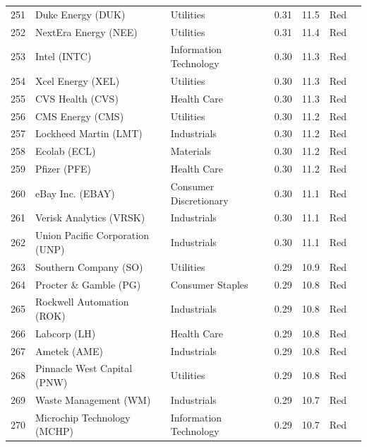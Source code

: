 \documentclass[11pt,a4paper]{article}
\begin{document}
{\begin{longtable}{r p{4.4cm} p{2.8cm} r r l l}
251 & Duke Energy (DUK) & Utilities & 0.31 & 11.5 & \cellcolor[HTML]{F4B6B6}Red &  \\
252 & NextEra Energy (NEE) & Utilities & 0.31 & 11.4 & \cellcolor[HTML]{F4B6B6}Red &  \\
253 & Intel (INTC) & Information Technology & 0.30 & 11.3 & \cellcolor[HTML]{F4B6B6}Red &  \\
254 & Xcel Energy (XEL) & Utilities & 0.30 & 11.3 & \cellcolor[HTML]{F4B6B6}Red &  \\
255 & CVS Health (CVS) & Health Care & 0.30 & 11.3 & \cellcolor[HTML]{F4B6B6}Red &  \\
256 & CMS Energy (CMS) & Utilities & 0.30 & 11.2 & \cellcolor[HTML]{F4B6B6}Red &  \\
257 & Lockheed Martin (LMT) & Industrials & 0.30 & 11.2 & \cellcolor[HTML]{F4B6B6}Red &  \\
258 & Ecolab (ECL) & Materials & 0.30 & 11.2 & \cellcolor[HTML]{F4B6B6}Red &  \\
259 & Pfizer (PFE) & Health Care & 0.30 & 11.2 & \cellcolor[HTML]{F4B6B6}Red &  \\
260 & eBay Inc. (EBAY) & Consumer Discretionary & 0.30 & 11.1 & \cellcolor[HTML]{F4B6B6}Red &  \\
261 & Verisk Analytics (VRSK) & Industrials & 0.30 & 11.1 & \cellcolor[HTML]{F4B6B6}Red &  \\
262 & Union Pacific Corporation (UNP) & Industrials & 0.30 & 11.1 & \cellcolor[HTML]{F4B6B6}Red &  \\
263 & Southern Company (SO) & Utilities & 0.29 & 10.9 & \cellcolor[HTML]{F4B6B6}Red &  \\
264 & Procter \& Gamble (PG) & Consumer Staples & 0.29 & 10.8 & \cellcolor[HTML]{F4B6B6}Red &  \\
265 & Rockwell Automation (ROK) & Industrials & 0.29 & 10.8 & \cellcolor[HTML]{F4B6B6}Red &  \\
266 & Labcorp (LH) & Health Care & 0.29 & 10.8 & \cellcolor[HTML]{F4B6B6}Red &  \\
267 & Ametek (AME) & Industrials & 0.29 & 10.8 & \cellcolor[HTML]{F4B6B6}Red &  \\
268 & Pinnacle West Capital (PNW) & Utilities & 0.29 & 10.8 & \cellcolor[HTML]{F4B6B6}Red &  \\
269 & Waste Management (WM) & Industrials & 0.29 & 10.7 & \cellcolor[HTML]{F4B6B6}Red &  \\
270 & Microchip Technology (MCHP) & Information Technology & 0.29 & 10.7 & \cellcolor[HTML]{F4B6B6}Red &  \\

\end{longtable}}
\end{document}
